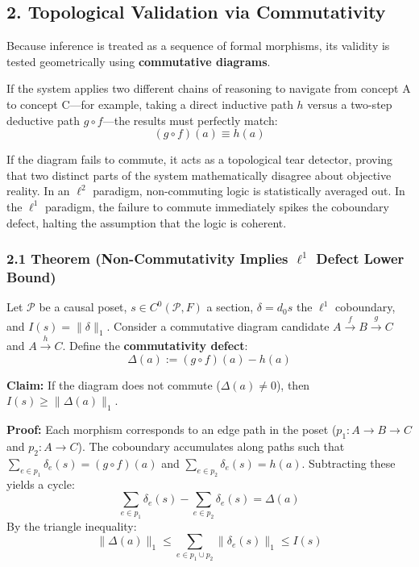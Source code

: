 \documentclass[
]{article}
\begin{document}
\subsection{2. Topological Validation via
Commutativity}\label{topological-validation-via-commutativity}

Because inference is treated as a sequence of formal morphisms, its
validity is tested geometrically using \textbf{commutative diagrams}.

If the system applies two different chains of reasoning to navigate from
concept A to concept C---for example, taking a direct inductive path
\(h\) versus a two-step deductive path \(g \circ f\)---the results must
perfectly match: \[(g \circ f)(a) \equiv h(a)\]

If the diagram fails to commute, it acts as a topological tear detector,
proving that two distinct parts of the system mathematically disagree
about objective reality. In an \(\ell^2\) paradigm, non-commuting logic
is statistically averaged out. In the \(\ell^1\) paradigm, the failure
to commute immediately spikes the coboundary defect, halting the
assumption that the logic is coherent.

\subsubsection{\texorpdfstring{2.1 Theorem (Non-Commutativity Implies
\(\ell^1\) Defect Lower
Bound)}{2.1 Theorem (Non-Commutativity Implies \textbackslash ell\^{}1 Defect Lower Bound)}}\label{theorem-non-commutativity-implies-ell1-defect-lower-bound}

Let \(\mathcal{P}\) be a causal poset, \(s \in C^0(\mathcal{P}, F)\) a
section, \(\delta = d_0 s\) the \(\ell^1\) coboundary, and
\(I(s) = \|\delta\|_1\). Consider a commutative diagram candidate
\(A \xrightarrow{f} B \xrightarrow{g} C\) and \(A \xrightarrow{h} C\).
Define the \textbf{commutativity defect}:
\[\Delta(a) := (g \circ f)(a) - h(a)\]

\textbf{Claim:} If the diagram does not commute (\(\Delta(a) \neq 0\)),
then \(I(s) \geq \|\Delta(a)\|_1\).

\textbf{Proof:} Each morphism corresponds to an edge path in the poset
(\(p_1: A \to B \to C\) and \(p_2: A \to C\)). The coboundary
accumulates along paths such that
\(\sum_{e \in p_1} \delta_e(s) = (g \circ f)(a)\) and
\(\sum_{e \in p_2} \delta_e(s) = h(a)\). Subtracting these yields a
cycle:
\[\sum_{e \in p_1} \delta_e(s) - \sum_{e \in p_2} \delta_e(s) = \Delta(a)\]
By the triangle inequality:
\[\|\Delta(a)\|_1 \leq \sum_{e \in p_1 \cup p_2} \|\delta_e(s)\|_1 \leq I(s)\]
\end{document}
